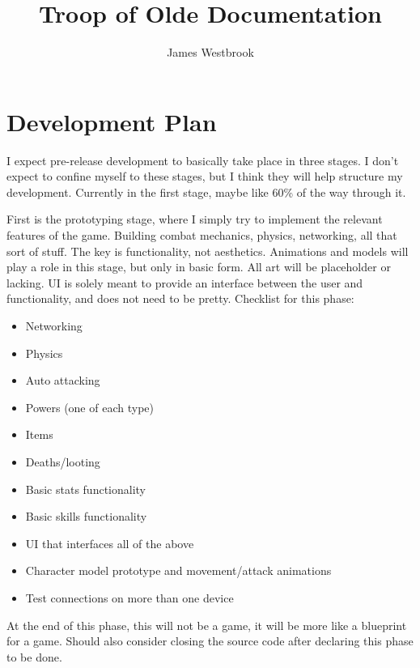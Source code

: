 \documentclass{article}
\title{Troop of Olde Documentation}
\author{James Westbrook}
\begin{document}
\maketitle

\tableofcontents

\pagebreak

\section{Development Plan}
I expect pre-release development to basically take place in three stages.
I don't expect to confine
myself to these stages, but I think they will help structure my development. Currently
in the first stage, maybe like 60\% of the way through it.

First is the prototyping stage, where I simply try to implement the relevant features
of the game. Building combat mechanics, physics, networking, all that sort of stuff.
The key is functionality, not aesthetics. Animations and models will play a role in this stage,
but only in basic form. All art will be placeholder or lacking. UI is solely meant to provide an
interface between the user and functionality, and does not need to be pretty.
Checklist for this phase:
\begin{itemize}
    \item Networking
    \item Physics
    \item Auto attacking
    \item Powers (one of each type)
    \item Items
    \item Deaths/looting
    \item Basic stats functionality
    \item Basic skills functionality
    \item UI that interfaces all of the above
    \item Character model prototype and movement/attack animations
    \item Test connections on more than one device
\end{itemize}
At the end of this phase, this will not be a game, it will be more like a blueprint for a game.
Should also consider closing the source code after declaring this phase to be done.
\end{document}
